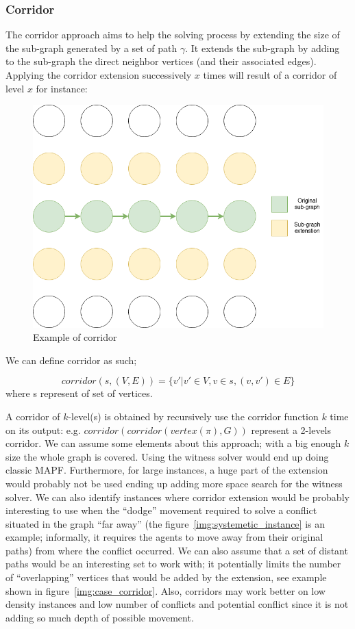 \subsubsection{Corridor}\label{sec:corridor}

The corridor approach aims to help the solving process by extending the size of the sub-graph generated by a set of path \(\gamma\). It extends the sub-graph by adding to the sub-graph the direct neighbor vertices (and their associated edges). Applying the corridor extension successively \(x\) times will result of a corridor of level \(x\) for instance:  
\begin{figure}[H]
  \centering
  \caption{Example of corridor}\label{img:corridor}
  \includegraphics[width=\widthimg]{img/corridor.drawio}
\end{figure}

We can define corridor as such;

\[
 corridor(s,(V,E)) = \{v' | v' \in V, v\in s, (v,v') \in E \}
\] where s represent of set of vertices.

A corridor of \(k\)-level(s) is obtained by recursively use the corridor function \(k\) time on its output: e.g. \(corridor(corridor(vertex(\pi),G))\) represent a 2-levels corridor.
We can assume some elements about this approach; with a big enough \(k\) size the whole graph is covered. Using the witness solver would end up doing classic MAPF. Furthermore, for large instances, a huge part of the extension would probably not be used ending up adding more space search for the witness solver. We can also identify instances where corridor extension would be probably interesting to use when the ``dodge'' movement required to solve a conflict situated in the graph ``far away'' (the figure~\ref{img:systemetic_instance} is an example; informally, it requires the agents to move away from their original paths) from where the conflict occurred. We can also assume that a set of distant paths would be an interesting set to work with; it potentially limits the number of ``overlapping'' vertices that would be added by the extension, see example shown in figure~\ref{img:case_corridor}. Also, corridors may work better on low density instances and low number of conflicts and potential conflict since it is not adding so much depth of possible movement.

